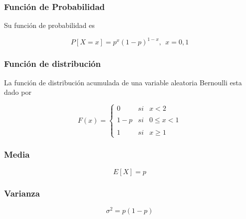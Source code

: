 \documentclass{article}
\begin{document}
            \subsubsection{Función de Probabilidad} 

                Su función de probabilidad es

                    \begin{equation*}
                        P[X=x] = p^x(1-p)^{1-x} ,~~x=0,1
                    \end{equation*}

            \subsubsection{Función de distribución}

                La función de distribución acumulada de una variable aleatoria Bernoulli esta dado por

                    \begin{equation*}
                                    F(x)= \left\{ \begin{array}{lcc}
                                     0 &   si  & x < 2 \\
                                     \\ 1-p &  si & 0 \leq  x < 1 \\
                                     \\ 1 &  si  & x \geq 1
                                     \end{array}
                           \right.
                    \end{equation*}

            \subsubsection{Media}

                \begin{equation*}
                    E[X] = p
                \end{equation*}
                
            \subsubsection{Varianza}

                \begin{equation*}
                    \sigma ^2 = p(1-p)
                \end{equation*}
                
\end{document}
